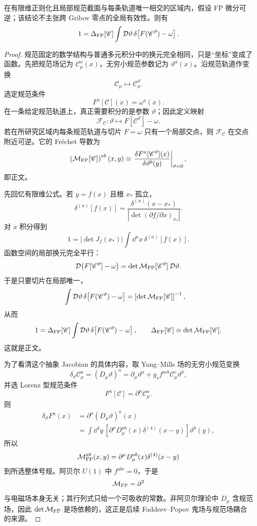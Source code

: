\begin{proposition}
在有限维正则化且局部规范截面与每条轨道唯一相交的区域内，假设 FP 微分可逆；该结论不主张跨 Gribov 零点的全局有效性。则有
\begin{equation}
 {
 1=\Delta_{\rm FP}[\mathscr C]
 \int\mathcal D\vartheta\,
 \delta\!\left[F(\mathscr C^\vartheta)-\omega\right].}
\label{eq:fp-identity-general-dp11}
\end{equation}
\end{proposition}
\begin{proof}
规范固定的数学结构与普通多元积分中的换元完全相同，只是“坐标”变成了函数。先把规范场记为 \(\mathscr C_\mu^a(x)\)，无穷小规范参数记为 \(\vartheta^a(x)\)。沿规范轨道作变换
\[
\mathscr C_\mu
\longmapsto
\mathscr C_\mu^\vartheta .
\]
选定规范条件
\[
F^a[\mathscr C](x)=\omega^a(x).
\]
在一条给定规范轨道上，真正需要积分的是参数 \(\vartheta\)；因此定义映射
\[
\mathcal F_{\mathscr C}:
\vartheta
\longmapsto
F[\mathscr C^\vartheta]-\omega .
\]
若在所研究区域内每条规范轨道与切片 \(F=\omega\) 只有一个局部交点，则
\(\mathcal F_{\mathscr C}\) 在交点附近可逆。它的 Fr\'echet 导数为
\[
\left(
\mathcal M_{\rm FP}[\mathscr C]
\right)^{ab}(x,y)
\equiv
\left.
\frac{\delta F^a[\mathscr C^\vartheta](x)}
{\delta\vartheta^b(y)}
\right|_{\vartheta=0},
\]
即正文。

先回忆有限维公式。若 \(y=f(x)\) 且根 \(x_*\) 孤立，
\[
\delta^{(n)}[f(x)]
=
\frac{\delta^{(n)}(x-x_*)}
{|\det(\partial f/\partial x)_{x_*}|}.
\]
对 \(x\) 积分得到
\[
1
=
|\det J_f(x_*)|
\int\dd^n x\,\delta^{(n)}[f(x)].
\]
函数空间的局部换元完全平行：
\[
\mathcal D\!\left(F[\mathscr C^\vartheta]-\omega\right)
=
\det\mathcal M_{\rm FP}[\mathscr C^\vartheta]\,
\mathcal D\vartheta .
\]
于是只要切片在局部唯一，
\begin{align*}
\int\mathcal D\vartheta\,
\delta\!\left[F(\mathscr C^\vartheta)-\omega\right]
&=
\left[
\det\mathcal M_{\rm FP}[\mathscr C]
\right]^{-1},
\end{align*}
从而
\[
{
1
=
\Delta_{\rm FP}[\mathscr C]
\int\mathcal D\vartheta\,
\delta\!\left[
F(\mathscr C^\vartheta)-\omega
\right],
\qquad
\Delta_{\rm FP}[\mathscr C]
\equiv
\det\mathcal M_{\rm FP}[\mathscr C].
}
\]
这就是正文。

为了看清这个抽象 Jacobian 的具体内容，取 Yang--Mills 场的无穷小规范变换
\[
\delta_\vartheta \mathscr C_\mu^a
=
(D_\mu\vartheta)^a
=
\partial_\mu\vartheta^a
+g_s f^{acb}\mathscr C_\mu^c\vartheta^b,
\]
并选 Lorenz 型规范条件
\[
F^a[\mathscr C]
=
\partial^\mu\mathscr C_\mu^a.
\]
则
\begin{align*}
\delta_\vartheta F^a(x)
&=
\partial^\mu
(D_\mu\vartheta)^a(x)\\
&=
\int\dd^4 y\,
\left[
\partial^\mu D_\mu^{ab}(x)
\delta^{(4)}(x-y)
\right]
\vartheta^b(y),
\end{align*}
所以
\[
\mathcal M_{\rm FP}^{ab}(x,y)
=
\partial^\mu D_\mu^{ab}(x)
\delta^{(4)}(x-y)
\]
到所选整体号规。阿贝尔 \(U(1)\) 中 \(f^{abc}=0\)，于是
\[
\mathcal M_{\rm FP}
=
\partial^2
\]
与电磁场本身无关；其行列式只给一个可吸收的常数。非阿贝尔理论中 \(D_\mu\) 含规范场，因此
\(\det\mathcal M_{\rm FP}\) 是场依赖的，这正是后续 Faddeev--Popov 鬼场与规范场耦合的来源。


\end{proof}
